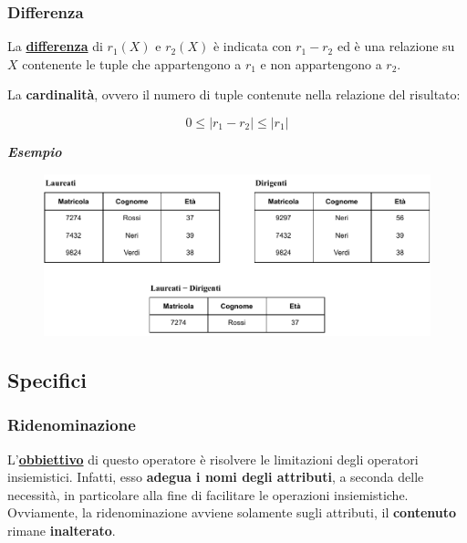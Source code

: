 \documentclass[a4paper]{article}
\begin{document}
	
	\subsubsection{Differenza}
	
	La \textcolor{Red3}{\textbf{\underline{differenza}}} di $r_{1}\left(X\right)$ e $r_{2}\left(X\right)$ è indicata con $r_{1} - r_{2}$ ed è una relazione su $X$ contenente le tuple che appartengono a $r_{1}$ e non appartengono a $r_{2}$.\newline
	
	\noindent
	La \textbf{cardinalità}, ovvero il numero di tuple contenute nella relazione del risultato:
	
	\begin{equation*}
		0 \le \left|r_{1} - r_{2}\right| \le |r_{1}|
	\end{equation*}

	\noindent
	\textcolor{Green4}{\textbf{\emph{Esempio}}}
	
	\begin{figure}[!htp]
		\centering
		\includegraphics[width=\textwidth]{img/differenza.pdf}
	\end{figure}

	\newpage
	
	\subsection{Specifici}
	
	\subsubsection{Ridenominazione}
	
	L'\textcolor{Red3}{\textbf{\underline{obbiettivo}}} di questo operatore è risolvere le limitazioni degli operatori insiemistici. Infatti, esso \textbf{adegua i nomi degli attributi}, a seconda delle necessità, in particolare alla fine di facilitare le operazioni insiemistiche. Ovviamente, la ridenominazione avviene solamente sugli attributi, il \textbf{contenuto} rimane \textbf{inalterato}.\newline
	
\end{document}
